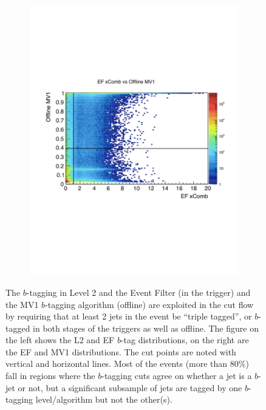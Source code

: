 \begin{figure}
	\begin{subfigure}[EF and MV1 $b$-tags]{0.45\textwidth}\includegraphics[width=\textwidth]{TriggerCuts/EF_MV1.pdf}\end{subfigure}
    \caption{The $b$-tagging in Level 2 and 
    the Event Filter (in the trigger) and the MV1 $b$-tagging algorithm
    (offline) are exploited in the cut flow by requiring that at least
    2 jets in the event be ``triple tagged'', or $b$-tagged in both
    stages of the triggers as well as offline.  The figure on the
    left shows the L2 and EF $b$-tag distributions, on the right are the
    EF and MV1 distributions.  The cut points are noted with vertical
    and horizontal lines.  Most of the events (more than 80\%) fall
    in regions where the $b$-tagging cuts agree on whether a jet is 
    a $b$-jet or not, but a significant subsample of jets are tagged by 
    one $b$-tagging level/algorithm but not the other(s). \label{fig:L2_EF}}
\end{figure}

